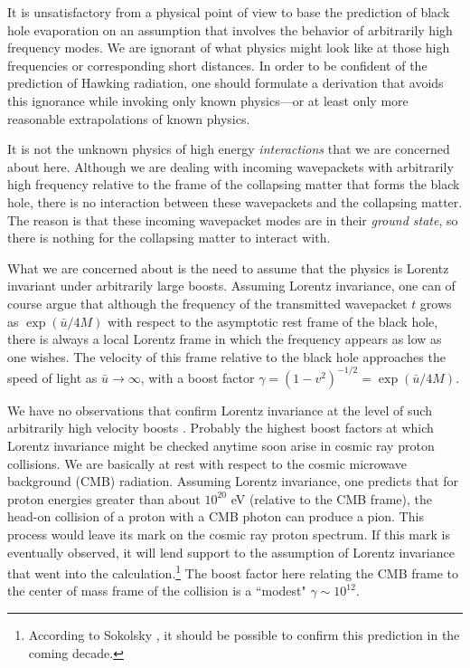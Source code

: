 \documentclass[12pt]{article}
\def\ubar{\bar{u}}
\begin{document}
It is unsatisfactory from a physical point of view to base
the prediction of black hole evaporation on an assumption
that involves the behavior of arbitrarily high frequency
modes. We are ignorant of what physics might look like at
those high frequencies or corresponding short distances.
In order to be confident of the prediction of Hawking
radiation, one should formulate a derivation that avoids
this ignorance while invoking only known physics---or at
least only more reasonable extrapolations of known physics.

It is not the unknown physics of high energy
{\it interactions} that we are concerned about here.
Although we are dealing with incoming
wavepackets with arbitrarily high frequency relative to
the frame of the collapsing matter that forms the black
hole, there is no interaction between these wavepackets
and the collapsing matter. The reason is that these incoming
wavepacket modes are in their {\it ground state}, so there
is nothing for the collapsing matter to interact with.

What we are concerned about is the need to assume that
the physics is Lorentz invariant under arbitrarily large boosts.
Assuming Lorentz invariance, one can of course argue
that although the frequency of the transmitted wavepacket $t$
grows as $\exp(\ubar/4M)$ with respect to the asymptotic rest frame
of the black hole, there is always a local Lorentz
frame in which the frequency appears as low as one wishes.
The velocity of this frame relative to the black hole
approaches the speed of light as $\ubar\rightarrow\infty$,
with a boost factor $\gamma=(1-v^2)^{-1/2}=\exp(\ubar/4M)$.

We have no observations that confirm Lorentz invariance
at the level of such arbitrarily high velocity boosts
\cite{Blok,NielPic,Will}.
Probably the highest boost factors at which Lorentz invariance
might be checked anytime soon arise in cosmic ray proton
collisions. We are basically at rest with respect to the cosmic
microwave background (CMB) radiation. Assuming Lorentz
invariance, one predicts that for proton energies greater
than about $10^{20}$ eV (relative to the CMB frame),
the head-on collision of a proton with a CMB photon can
produce a pion. This process would leave its mark on the
cosmic ray proton spectrum. If this mark is eventually
observed, it will lend support to the assumption of
Lorentz invariance that went into the
calculation.\footnote{According to Sokolsky \cite{Sokol}, it
should be possible to confirm this prediction in the coming decade.}
The boost factor here relating the CMB frame to the center of mass
frame of the collision is a ``modest" $\gamma\sim 10^{12}$.
\end{document}

